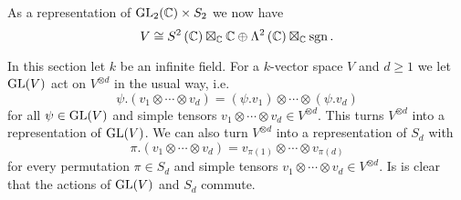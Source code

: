 \begin{expl}
  As a representation of $\operatorname{GL}_2(\mathbb{C}) \times S_2$ we now have
  \[
          V
    \cong         S^2\left( \mathbb{C} \right) \boxtimes_{\mathbb{C}} \mathbb{C}
          \oplus  \Lambda^2\left( \mathbb{C} \right) \boxtimes_{\mathbb{C}} \operatorname{sgn}.
  \]
\end{expl}


In this section let $k$ be an infinite field.
For a $k$-vector space $V$ and $d \geq 1$ we let $\operatorname{GL}(V)$ act on $V^{\otimes d}$ in the usual way, i.e.\
\[
    \psi.(v_1 \otimes \dotsb \otimes v_d)
  = (\psi.v_1) \otimes \dotsb \otimes (\psi.v_d)
\]
for all $\psi \in \operatorname{GL}(V)$ and simple tensors $v_1 \otimes \dotsb \otimes v_d \in V^{\otimes d}$.
This turns $V^{\otimes d}$ into a representation of $\operatorname{GL}(V)$.
We can also turn $V^{\otimes d}$ into a representation of $S_d$ with
\[
    \pi.(v_1 \otimes \dotsb \otimes v_d)
  = v_{\pi(1)} \otimes \dotsb \otimes v_{\pi(d)}
\]
for every permutation $\pi \in S_d$ and simple tensors $v_1 \otimes \dotsb \otimes v_d \in V^{\otimes d}$. 
Is is clear that the actions of $\operatorname{GL}(V)$ and $S_d$ commute.


